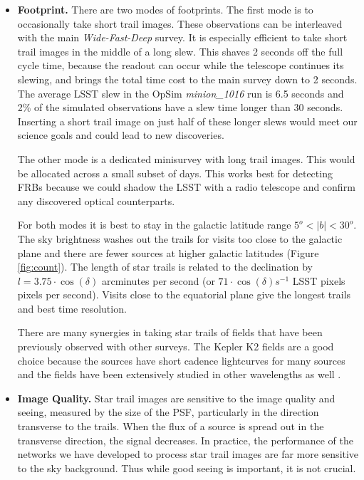 \documentclass[12pt, letterpaper]{article}
\begin{document}
\begin{itemize}
\item \textbf{Footprint.} There are two modes of footprints. The first mode is to occasionally take short trail images. These observations can be interleaved with the main \textit{Wide-Fast-Deep} survey. It is especially efficient to take short trail images in the middle of a long slew. This shaves 2 seconds off the full cycle time, because the readout can occur while the telescope continues its slewing, and brings the total time cost to the main survey down to 2 seconds. The average LSST slew in the OpSim \textit{minion\_1016} run is 6.5 seconds and 2\% of the simulated observations have a slew time longer than 30 seconds. Inserting a short trail image on just half of these longer slews would meet our science goals and could lead to new discoveries. 

The other mode is a dedicated minisurvey with long trail images. This would be allocated across a small subset of days. This works best for detecting FRBs because we could shadow the LSST with a radio telescope and confirm any discovered optical counterparts.

For both modes it is best to stay in the galactic latitude range $5^o < |b| < 30^o$. The sky brightness washes out the trails for visits too close to the galactic plane and there are fewer sources at higher galactic latitudes (Figure \ref{fig:count}). The length of star trails is related to the declination by $l = 3.75 \cdot \cos(\delta)$ arcminutes per second (or $71 \cdot \cos(\delta) s^{-1}$ LSST pixels pixels per second). Visits close to the equatorial plane give the longest trails and best time resolution. 

There are many synergies in taking star trails of fields that have been previously observed with other surveys. The Kepler K2 fields \citep{2014PASP..126..398H} are a good choice because the sources have short cadence lightcurves for many sources and the fields have been extensively studied in other wavelengths as well \citep{2016HEAD...1510605S}.

\item \textbf{Image Quality.} Star trail images are sensitive to the image quality and seeing, measured by the size of the PSF, particularly in the direction transverse to the trails. When the flux of a source is spread out in the transverse direction, the signal decreases. In practice, the performance of the networks we have developed to process star trail images are far more sensitive to the sky background. Thus while good seeing is important, it is not crucial.


\end{itemize}
\end{document}
